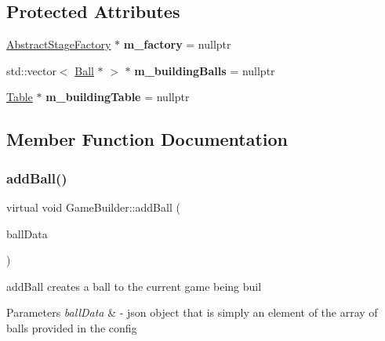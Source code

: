 \subsection*{Protected Attributes}
\begin{DoxyCompactItemize}
\item 
\mbox{\label{class_game_builder_a2b8da37dc88d521fc01841a2c308508f}} 
\mbox{\hyperlink{class_abstract_stage_factory}{Abstract\+Stage\+Factory}} $\ast$ {\bfseries m\+\_\+factory} = nullptr
\item 
\mbox{\label{class_game_builder_a00bf40f2a9c4c72ff8e9bc94201bb681}} 
std\+::vector$<$ \mbox{\hyperlink{class_ball}{Ball}} $\ast$ $>$ $\ast$ {\bfseries m\+\_\+building\+Balls} = nullptr
\item 
\mbox{\label{class_game_builder_a0fe16583df85f0360cfe9b06a7ea3aee}} 
\mbox{\hyperlink{class_table}{Table}} $\ast$ {\bfseries m\+\_\+building\+Table} = nullptr
\end{DoxyCompactItemize}


\subsection{Member Function Documentation}
\mbox{\label{class_game_builder_a836186637bd2f7844f7dfac0135d833b}} 
\subsubsection{\texorpdfstring{add\+Ball()}{addBall()}}
{\footnotesize\ttfamily virtual void Game\+Builder\+::add\+Ball (\begin{DoxyParamCaption}\item[{Q\+Json\+Object \&}]{ball\+Data }\end{DoxyParamCaption})\hspace{0.3cm}{\ttfamily [pure virtual]}}



add\+Ball creates a ball to the current game being buil 


\begin{DoxyParams}{Parameters}
{\em ball\+Data} & -\/ json object that is simply an element of the array of balls provided in the config \\
\hline
\end{DoxyParams}



